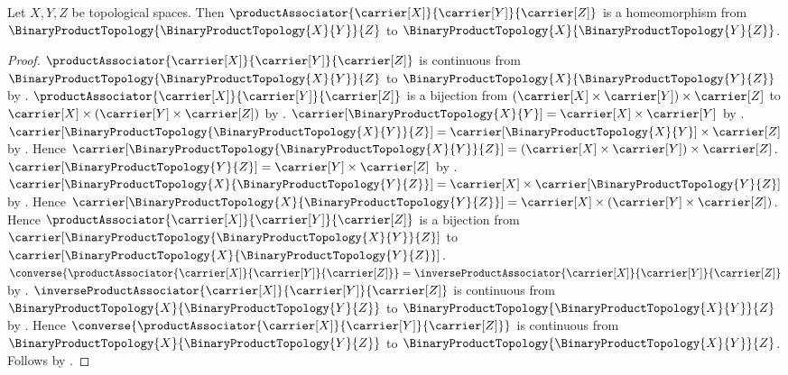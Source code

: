 \begin{theorem}\label{product_associator_homeomorphism}
    Let $X,Y,Z$ be topological spaces.
    Then $\productAssociator{\carrier[X]}{\carrier[Y]}{\carrier[Z]}$
        is a homeomorphism from
        $\BinaryProductTopology{\BinaryProductTopology{X}{Y}}{Z}$ to
        $\BinaryProductTopology{X}{\BinaryProductTopology{Y}{Z}}$.
\end{theorem}
\begin{proof}
    $\productAssociator{\carrier[X]}{\carrier[Y]}{\carrier[Z]}$ is
        continuous from
        $\BinaryProductTopology{\BinaryProductTopology{X}{Y}}{Z}$ to
        $\BinaryProductTopology{X}{\BinaryProductTopology{Y}{Z}}$ by
        .
    $\productAssociator{\carrier[X]}{\carrier[Y]}{\carrier[Z]}$ is a
        bijection from
        $(\carrier[X]\times\carrier[Y])\times\carrier[Z]$ to
        $\carrier[X]\times(\carrier[Y]\times\carrier[Z])$ by
        .
    $\carrier[\BinaryProductTopology{X}{Y}]
        =\carrier[X]\times\carrier[Y]$ by
        .
    $\carrier[\BinaryProductTopology{\BinaryProductTopology{X}{Y}}{Z}]
        =\carrier[\BinaryProductTopology{X}{Y}]\times\carrier[Z]$ by
        .
    Hence $\carrier[\BinaryProductTopology{
        \BinaryProductTopology{X}{Y}}{Z}]
        =(\carrier[X]\times\carrier[Y])\times\carrier[Z]$.
    $\carrier[\BinaryProductTopology{Y}{Z}]
        =\carrier[Y]\times\carrier[Z]$ by
        .
    $\carrier[\BinaryProductTopology{X}{
        \BinaryProductTopology{Y}{Z}}]
        =\carrier[X]\times
            \carrier[\BinaryProductTopology{Y}{Z}]$ by
        .
    Hence $\carrier[\BinaryProductTopology{X}{
        \BinaryProductTopology{Y}{Z}}]
        =\carrier[X]\times(\carrier[Y]\times\carrier[Z])$.
    Hence $\productAssociator{
        \carrier[X]}{\carrier[Y]}{\carrier[Z]}$ is a bijection from
        $\carrier[\BinaryProductTopology{
            \BinaryProductTopology{X}{Y}}{Z}]$ to
        $\carrier[\BinaryProductTopology{X}{
            \BinaryProductTopology{Y}{Z}}]$.
    $\converse{\productAssociator{
        \carrier[X]}{\carrier[Y]}{\carrier[Z]}}
        =\inverseProductAssociator{
            \carrier[X]}{\carrier[Y]}{\carrier[Z]}$ by
        .
    $\inverseProductAssociator{
        \carrier[X]}{\carrier[Y]}{\carrier[Z]}$ is continuous from
        $\BinaryProductTopology{X}{\BinaryProductTopology{Y}{Z}}$ to
        $\BinaryProductTopology{\BinaryProductTopology{X}{Y}}{Z}$ by
        .
    Hence $\converse{\productAssociator{
        \carrier[X]}{\carrier[Y]}{\carrier[Z]}}$ is continuous from
        $\BinaryProductTopology{X}{\BinaryProductTopology{Y}{Z}}$ to
        $\BinaryProductTopology{\BinaryProductTopology{X}{Y}}{Z}$.
    Follows by .
\end{proof}
